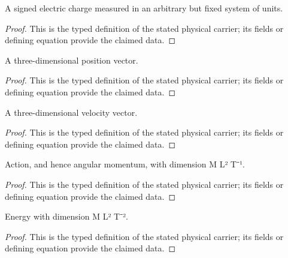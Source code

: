 \begin{definition}
  \label{def:physics:IPhO_2026_1_B_1:aux003}
  A signed electric charge measured in an arbitrary but fixed system of units.
\end{definition}
\begin{proof}
  This is the typed definition of the stated physical carrier; its fields or defining equation provide the claimed data.
\end{proof}

\begin{definition}
  \label{def:physics:IPhO_2026_1_B_1:aux004}
  A three-dimensional position vector.
\end{definition}
\begin{proof}
  This is the typed definition of the stated physical carrier; its fields or defining equation provide the claimed data.
\end{proof}

\begin{definition}
  \label{def:physics:IPhO_2026_1_B_1:aux005}
  A three-dimensional velocity vector.
\end{definition}
\begin{proof}
  This is the typed definition of the stated physical carrier; its fields or defining equation provide the claimed data.
\end{proof}

\begin{definition}
  \label{def:physics:IPhO_2026_1_B_1:aux006}
  Action, and hence angular momentum, with dimension M L² T⁻¹.
\end{definition}
\begin{proof}
  This is the typed definition of the stated physical carrier; its fields or defining equation provide the claimed data.
\end{proof}

\begin{definition}
  \label{def:physics:IPhO_2026_1_B_1:aux007}
  Energy with dimension M L² T⁻².
\end{definition}
\begin{proof}
  This is the typed definition of the stated physical carrier; its fields or defining equation provide the claimed data.
\end{proof}

